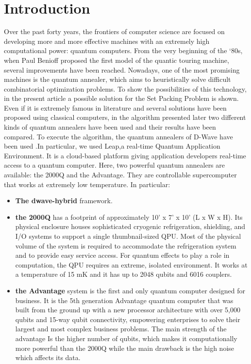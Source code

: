 \documentclass[oneside,a4paper]{article}
\begin{document}
\section{Introduction}
Over the past forty years, the frontiers of computer science are focused on developing more and more effective machines with an extremely high computational power: quantum computers. From the very beginning of the ‘80s, when Paul Benioff proposed the first model of the quantic touring machine, several improvements have been reached. Nowadays, one of the most promising machines is the quantum annealer, which aims to heuristically solve difficult combinatorial optimization problems\cite{WebSite3}. To show the possibilities of this technology, in the present article a possible solution for the Set Packing Problem is shown. Even if it is extremely famous in literature and several solutions have been proposed using classical computers, in the algorithm presented later two different kinds of quantum annealers have been used and their results have been compared.
To execute the algorithm, the quantum annealers of D-Wave have been used \cite{article1}.In particular, we used Leap,a real-time Quantum Application Environment. It is a cloud-based platform giving application developers real-time access to a quantum computer. Here, two powerful quantum annealers are available: the 2000Q and the Advantage. They are controllable supercomputer that works at extremely low temperature. In particular: 
\begin{itemize}
    \item \textbf{The dwave-hybrid} framework.
    \item \textbf{the 2000Q} has a footprint of approximately 10' x 7' x 10' (L x W x H). Its physical enclosure houses sophisticated cryogenic refrigeration, shielding, and I/O systems to support a single thumbnail-sized QPU.  Most of the physical volume of the system is required to accommodate the refrigeration system 
and to provide easy service access.  For quantum effects to play a role in computation, the QPU requires an extreme, isolated environment. It works at a temperature of 15 mK and it has up to 2048 qubits and 6016 couplers.
    \item \textbf{the Advantage} system is the first and only quantum computer designed for business. 
    It is the 5th generation Advantage quantum computer that was built from the ground up with 
    a new processor architecture with over 5,000 qubits and 15-way qubit connectivity, empowering enterprises to solve their largest and most complex business problems. The main strength of the advantage Is the higher number of qubits, which makes it computationally more powerful than the 2000Q while the main drawback is the high noise which affects its data.
\end{itemize}
\end{document}
